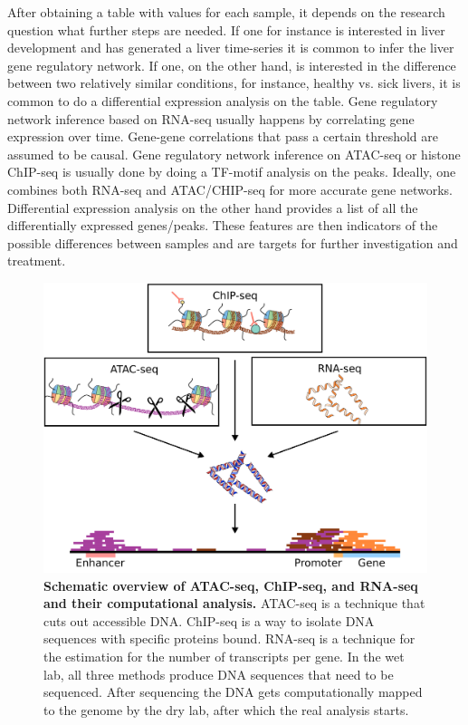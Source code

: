 After obtaining a table with values for each sample, it depends on the research question what further steps are needed. If one for instance is interested in liver development and has generated a liver time-series it is common to infer the liver gene regulatory network. If one, on the other hand, is interested in the difference between two relatively similar conditions, for instance, healthy vs. sick livers, it is common to do a differential expression analysis on the table. Gene regulatory network inference based on RNA-seq usually happens by correlating gene expression over time. Gene-gene correlations that pass a certain threshold are assumed to be causal. Gene regulatory network inference on ATAC-seq or histone ChIP-seq is usually done by doing a TF-motif analysis on the peaks. Ideally, one combines both RNA-seq and ATAC/CHIP-seq for more accurate gene networks. Differential expression analysis on the other hand provides a list of all the differentially expressed genes/peaks. These features are then indicators of the possible differences between samples and are targets for further investigation and treatment.

\begin{figure}
    \center
    \includegraphics[width=0.8\linewidth]{ch.introduction/imgs/analysis.png}
    \caption{\textbf{Schematic overview of ATAC-seq, ChIP-seq, and RNA-seq and their computational analysis.} ATAC-seq is a technique that cuts out accessible DNA. ChIP-seq is a way to isolate DNA sequences with specific proteins bound. RNA-seq is a technique for the estimation for the number of transcripts per gene. In the wet lab, all three methods produce DNA sequences that need to be sequenced. After sequencing the DNA gets computationally mapped to the genome by the dry lab, after which the real analysis starts. }
    \label{fig:analysis}
\end{figure}

